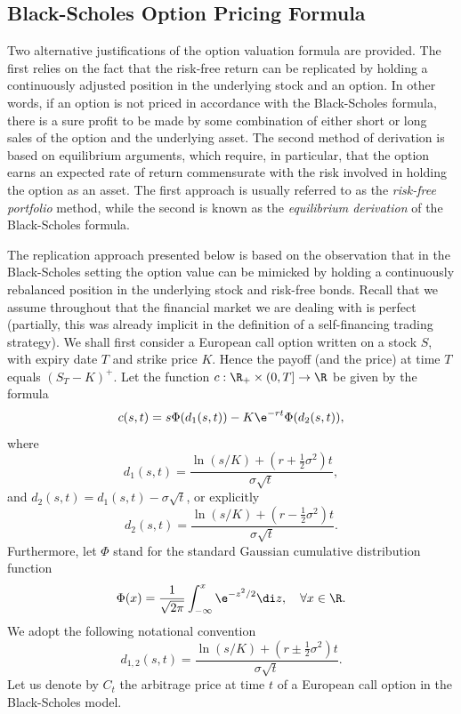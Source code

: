 \subsection{Black-Scholes Option Pricing Formula}
Two alternative justifications of the option valuation formula are provided. The first relies on the fact that the risk-free return can be replicated by holding a continuously adjusted position in the underlying stock and an option. In other words, if an option is not priced in accordance with the Black-Scholes formula, there is a sure profit to be made by some combination of either short or long sales of the option and the underlying asset. The second method of derivation is based on equilibrium arguments, which require, in particular, that the option earns an expected rate of return commensurate with the risk involved in holding the option as an asset. The first approach is usually referred to as the \textit{risk-free portfolio} method, while the second is known as the \textit{equilibrium derivation} of the Black-Scholes formula.

The replication approach presented below is based on the observation that in the Black-Scholes setting the option value can be mimicked by holding a continuously rebalanced position in the underlying stock and risk-free bonds. Recall that we assume throughout that the financial market we are dealing with is perfect (partially, this was already implicit in the definition of a self-financing trading strategy).
We shall first consider a European call option written on a stock $S$, with expiry date $T$ and strike price $K$. Hence the payoff (and the price) at time $T$ equals $(S_T - K)^+$. Let the function $c : \R_+ \times (0, T] \to \R$ be given by the formula
\begin{equation}
	c(s, t) = s \Phi(d_1(s, t)) - K \e^{-rt} \Phi(d_2(s, t)),
	\label{eq:CallPrice}
\end{equation}
where
\begin{equation}
	d_1(s, t) = \frac{\ln(s/K) + (r + \frac{1}{2}\sigma^2)t}{\sigma \sqrt{t}},
	\label{eq:D1Definition}
\end{equation}
and $d_2(s, t) = d_1(s, t) - \sigma \sqrt{t}$, or explicitly
\begin{equation}
	d_2(s, t) = \frac{\ln(s/K) + (r - \frac{1}{2}\sigma^2)t}{\sigma \sqrt{t}}.
	\label{eq:D2Definition}
\end{equation}
Furthermore, let $\Phi$ stand for the standard Gaussian cumulative distribution function
\begin{equation*}
	\Phi(x) = \frac{1}{\sqrt{2\pi}} \int_{-\infty}^x \e^{-z^2/2} \di z, \quad \forall x \in \R.
\end{equation*}
We adopt the following notational convention
\begin{equation*}
	d_{1,2}(s, t) = \frac{\ln(s/K) + (r \pm \frac{1}{2}\sigma^2)t}{\sigma \sqrt{t}}.
\end{equation*}
Let us denote by $C_t$ the arbitrage price at time $t$ of a European call option in the Black-Scholes model.

